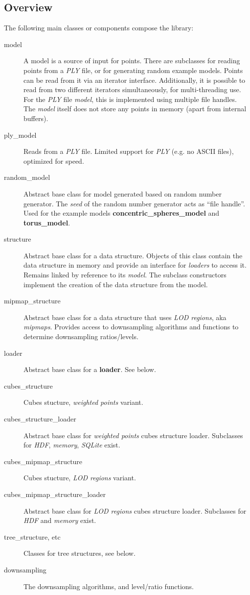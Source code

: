 \documentclass[a4paper,10pt,abstracton,notitlepage]{scrreprt}
\begin{document}
\subsection{Overview}
The following main classes or components compose the library:
\begin{description}
\item[model] A model is a source of input for points. There are subclasses for reading points from a \emph{PLY} file, or for generating random example models. Points can be read from it via an iterator interface. Additionally, it is possible to read from two different iterators simultaneously, for multi-threading use. For the \emph{PLY} file \emph{model}, this is implemented using multiple file handles. The \emph{model} itself does not store any points in memory (apart from internal buffers).
\item[ply\_model] Reads from a \emph{PLY} file. Limited support for \emph{PLY} (e.g. no ASCII files), optimized for speed.
\item[random\_model] Abstract base class for model generated based on random number generator. The \emph{seed} of the random number generator acts as ``file handle''. Used for the example models \textbf{concentric\_spheres\_model} and \textbf{torus\_model}.
\item[structure] Abstract base class for a data structure. Objects of this class contain the data structure in memory and provide an interface for \emph{loaders} to access it. Remains linked by reference to its \emph{model}. The subclass constructors implement the creation of the data structure from the model.
\item[mipmap\_structure] Abstract base class for a data structure that uses \emph{LOD regions}, aka \emph{mipmaps}. Provides access to downsampling algorithms and functions to determine downsampling ratios/levels.
\item[loader] Abstract base class for a \textbf{loader}. See below.
\item[cubes\_structure] Cubes stucture, \emph{weighted points} variant.
\item[cubes\_structure\_loader] Abstract base class for \emph{weighted points} cubes structure loader. Subclasses for \emph{HDF}, \emph{memory}, \emph{SQLite} exist.
\item[cubes\_mipmap\_structure] Cubes stucture, \emph{LOD regions} variant.
\item[cubes\_mipmap\_structure\_loader] Abstract base class for \emph{LOD regions} cubes structure loader. Subclasses for \emph{HDF} and \emph{memory} exist.
\item[tree\_structure, etc] Classes for tree structures, see below.
\item[downsampling] The downsampling algorithms, and level/ratio functions.
\end{description}
\end{document}
